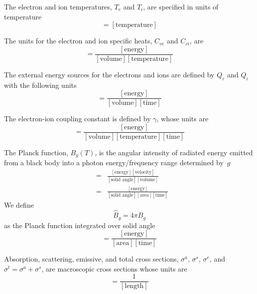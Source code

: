\documentclass{article}
\newcommand{\Bg}{\ensuremath{\hat{B}_{g}}}
\newcommand{\units}[1]{\ensuremath{[\mbox{#1}]}}
\begin{document}
The electron and ion temperatures, $T_{e}$ and $T_{i}$, are specified
in units of temperature
\begin{equation}
        [T] = \units{temperature}
\end{equation}

The units for the electron and ion specific heats, $C_{ve}$ and $C_{vi}$, are 
\begin{equation}
        [C_{v}] = \frac{\units{energy}}{\units{volume}\units{temperature}}
\end{equation}

The external energy sources for the electrons and ions are defined by
$Q_{e}$ and $Q_{i}$ with the following units
\begin{equation}
        [Q] = \frac{\units{energy}}{\units{volume}\units{time}}
\end{equation}

The electron-ion coupling constant is defined by $\gamma$, whose units are
\begin{equation}
        [\gamma] = \frac{\units{energy}}{\units{volume}\units{temperature}
                                         \units{time}}
\end{equation}

The Planck function, $B_{g}(T)$, is the angular intensity
of radiated energy emitted from a 
black body into a photon energy/frequency range determined by~$g$
\begin{eqnarray}
        [B_{g}] &=& \frac{\units{energy} \units{velocity}}
                         {\units{solid angle} \units{volume}} \\
                &=& \frac{\units{energy}}
                         {\units{solid angle} \units{area} \units{time}}
\end{eqnarray}
We define
\begin{equation}
   \Bg = 4\pi B_{g}
\end{equation}
 as the Planck function integrated over solid angle
\begin{equation}
        [\Bg] = \frac{\units{energy}}
                     {\units{area} \units{time}}
\end{equation}

Absorption, scattering, emissive, and total cross sections, $\sigma^{a}$,
$\sigma^{s}$, $\sigma^{e}$, and $\sigma^{t} = \sigma^{a} + \sigma^{s}$,
are macroscopic cross sections whose units are
\begin{equation}
        [\sigma] = \frac{1}{\units{length}}
\end{equation}
\end{document}
